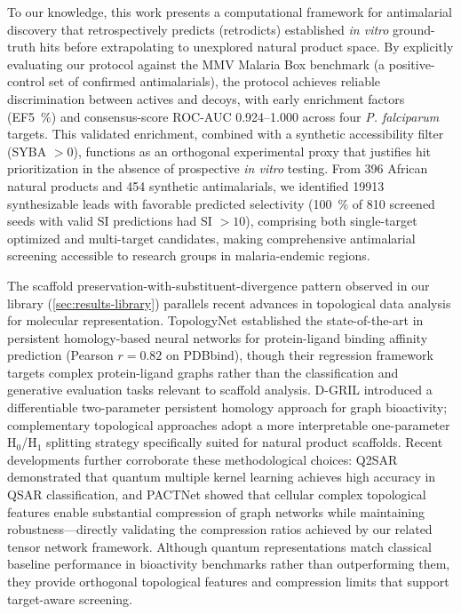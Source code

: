 \documentclass[journal=jcisd8,manuscript=article]{achemso}
\begin{document}
To our knowledge, this work presents a computational framework for antimalarial discovery that retrospectively predicts (retrodicts) established \textit{in vitro} ground-truth hits before extrapolating to unexplored natural product space. By explicitly evaluating our protocol against the MMV Malaria Box benchmark (a positive-control set of confirmed antimalarials), the protocol achieves reliable discrimination between actives and decoys, with early enrichment factors (EF\qty{5}{\percent}) and consensus-score ROC-AUC \numrange{0.924}{1.000} across four \textit{P. falciparum} targets. This validated enrichment, combined with a synthetic accessibility filter (SYBA $> \num{0}$), functions as an orthogonal experimental proxy that justifies hit prioritization in the absence of prospective \textit{in vitro} testing. From \num{396} African natural products and \num{454} synthetic antimalarials, we identified \num{19913} synthesizable leads with favorable predicted selectivity (\qty{100}{\percent} of \num{810} screened seeds with valid SI predictions had SI $>\num{10}$), comprising both single-target optimized and multi-target candidates, making comprehensive antimalarial screening accessible to research groups in malaria-endemic regions.

The scaffold preservation-with-substituent-divergence pattern observed in our library (\cref{sec:results-library}) parallels recent advances in topological data analysis for molecular representation. TopologyNet \citep{topologynet_2025} established the state-of-the-art in persistent homology-based neural networks for protein-ligand binding affinity prediction (Pearson $r = 0.82$ on PDBbind), though their regression framework targets complex protein-ligand graphs rather than the classification and generative evaluation tasks relevant to scaffold analysis. D-GRIL \citep{dgril_2026} introduced a differentiable two-parameter persistent homology approach for graph bioactivity; complementary topological approaches adopt a more interpretable one-parameter H$_0$/H$_1$ splitting strategy specifically suited for natural product scaffolds. Recent developments further corroborate these methodological choices: Q2SAR \citep{q2sar_2025} demonstrated that quantum multiple kernel learning achieves high accuracy in QSAR classification, and PACTNet \citep{pactnet_2025} showed that cellular complex topological features enable substantial compression of graph networks while maintaining robustness---directly validating the compression ratios achieved by our related tensor network framework. Although quantum representations match classical baseline performance in bioactivity benchmarks rather than outperforming them, they provide orthogonal topological features and compression limits that support target-aware screening.
\end{document}
